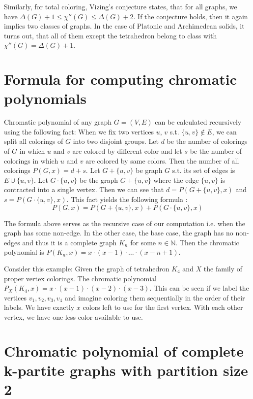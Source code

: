 Similarly, for total coloring, Vizing's conjecture \cite{vizing68} states, that for all graphs, we have $\Delta(G) + 1 \leq \chi''(G) \leq \Delta(G) + 2$. If the conjecture holds, then it again implies two classes of graphs. In the case of Platonic and Archimedean solids, it turns out, that all of them except the tetrahedron belong to class with $\chi''(G) = \Delta(G) + 1$.

\section{Formula for computing chromatic polynomials}

Chromatic polynomial of any graph $G=(V,E)$ can be calculated recursively using the following fact: When we fix two vertices $u$, $v$ s.t. $\{u,v\} \notin E$, we can split all colorings of $G$ into two disjoint groups. Let $d$ be the number of colorings of $G$ in which $u$ and $v$ are colored by different color and let $s$ be the number of colorings in which $u$ and $v$ are colored by same colors. Then the number of all colorings $P(G,x) = d + s$. Let $G+\{u,v\}$ be graph $G$ s.t. its set of edges is $E \cup \{u,v\}$. Let $G \cdot \{u,v\}$ be the graph $G + \{u,v\}$ where the edge $\{u,v\}$ is contracted into a single vertex. Then we can see that $d = P(G + \{u,v\},x)$ and $s = P(G \cdot \{u,v\},x)$. This fact yields the following formula \cite{chartrand2019}:
\begin{equation}\label{eqn:chrom_poly_nonedge}
 P(G,x) = P(G + \{u,v\},x) + P(G \cdot \{u,v\},x)
\end{equation}

The formula above serves as the recursive case of our computation i.e. when the graph has some non-edge. In the other case, the base case, the graph has no non-edges and thus it is a complete graph $K_n$ for some $n \in \mathbb{N}$. Then the chromatic polynomial is $P(K_n,x) = x \cdot (x-1) \cdot \ldots \cdot (x-n+1)$.

Consider this example: Given the graph of tetrahedron $K_4$ and $X$ the family of proper vertex colorings. The chromatic polynomial $P_{X}(K_4,x) = x \cdot (x-1) \cdot (x-2) \cdot (x-3)$. This can be seen if we label the vertices $v_1,v_2,v_3,v_4$ and imagine coloring them sequentially in the order of their labels. We have exactly $x$ colors left to use for the first vertex. With each other vertex, we have one less color available to use. 

\section{Chromatic polynomial of complete k-partite graphs with partition size 2}

